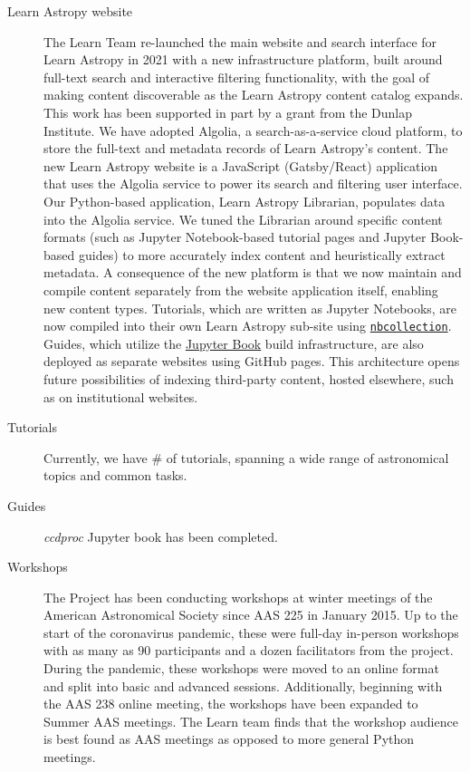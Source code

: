 \documentclass[modern]{aastex631}
\begin{document}
\begin{description}

\item[Learn Astropy website] The Learn Team re-launched the main website and
search interface for Learn Astropy in 2021 with a new infrastructure platform,
built around full-text search and interactive filtering functionality, with the
goal of making content discoverable as the Learn Astropy content catalog
expands.
This work has been supported in part by a grant from the Dunlap Institute.
We have adopted Algolia, a search-as-a-service cloud platform, to store the
full-text and metadata records of Learn Astropy's content.
The new Learn Astropy website is a JavaScript (Gatsby/React) application that
uses the Algolia service to power its search and filtering user interface.
Our Python-based application, Learn Astropy Librarian, populates data into the
Algolia service. We tuned the Librarian around specific content formats (such as
Jupyter Notebook-based tutorial pages and Jupyter Book-based guides) to more
accurately index content and heuristically extract metadata.
A consequence of the new platform is that we now maintain and compile content
separately from the website application itself, enabling new content types.
Tutorials, which are written as Jupyter Notebooks, are now compiled into their
own Learn Astropy sub-site using
\href{https://github.com/astropy/nbcollection}{\texttt{nbcollection}}.
Guides, which utilize the \href{https://jupyterbook.org/}{Jupyter Book} build
infrastructure, are also deployed as separate websites using GitHub pages.
This architecture opens future possibilities of indexing third-party content,
hosted elsewhere, such as on institutional websites.

\item[Tutorials] Currently, we have \# of tutorials, spanning a wide range of astronomical topics and common tasks.

\item[Guides] {\it ccdproc} Jupyter book has been completed.

\item[Workshops] The Project has been conducting workshops at winter
meetings of the American Astronomical Society since AAS 225 in January 2015.
Up to the start of the coronavirus pandemic, these were full-day in-person
workshops with as many as 90 participants and a dozen facilitators from the
project.
During the pandemic, these workshops were moved to an online format and split
into basic and advanced sessions.
Additionally, beginning with the AAS 238 online meeting, the workshops have been
expanded to Summer AAS meetings.
The Learn team finds that the workshop audience is best found as AAS meetings as
opposed to more general Python meetings.


\end{description}
\end{document}
